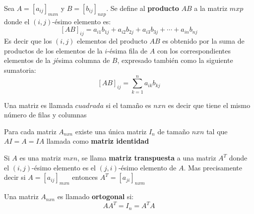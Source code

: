 \begin{defi}\citep{Blyth_2002}
    Sea $A={\left[a_{ij} \right]}_{mxn}$ y $B={\left[b_{ij} \right]}_{nxp}$. Se define al \textbf{producto} $AB$ a la matriz $mxp$ donde el $(i,j)$-ésimo elemento es:
    $${\left[AB \right]}_{ij}=a_{i1}b_{1j}+a_{i2}b_{2j}+a_{i3}b_{3j}+\cdots+a_{in}b_{nj}$$ 
    Es decir que los $(i,j)$ elementos del producto $AB$ es obtenido por la suma de productos de los elementos de la $i$-\'esima fila de $A$ con los correspondientes elementos de la $j$\'esima columna de $B$, expresado también como la siguiente sumatoria:
    $${\left[AB \right]}_{ij}=\sum\limits_{k = 1}^{n}a_{ik}b_{kj}$$
\end{defi}

\begin{defi}\citep{Blyth_2002}
    Una matriz es llamada $cuadrada$ si el tamaño es $nxn$ es decir que tiene el mismo número de filas y columnas
\end{defi}

\begin{defi}\citep{Blyth_2002}
    Para cada matriz $A_{nxn}$ existe una única matriz $I_{n}$ de tamaño $nxn$ tal que $AI=A=IA$ llamada como \textbf{matriz identidad}  
\end{defi}

\begin{defi}\citep{Blyth_2002}
    Si $A$ es una matriz $mxn$, se llama \textbf{matriz transpuesta} a una matriz $A^T$ donde el $(i,j)$-\'esimo elemento es el $(j,i)$-\'esimo elemento de $A$. Mas precisamente decir si $A={\left[a_{ij} \right]}_{mxn}$ entonces $A^T={\left[a_{ji} \right]}_{nxm}$    
\end{defi}

\begin{defi}\citep{Blyth_2002}
    Una matriz $A_{nxn}$ es llamado \textbf{ortogonal} si:
    $$AA^T=I_n=A^TA$$    
\end{defi}

